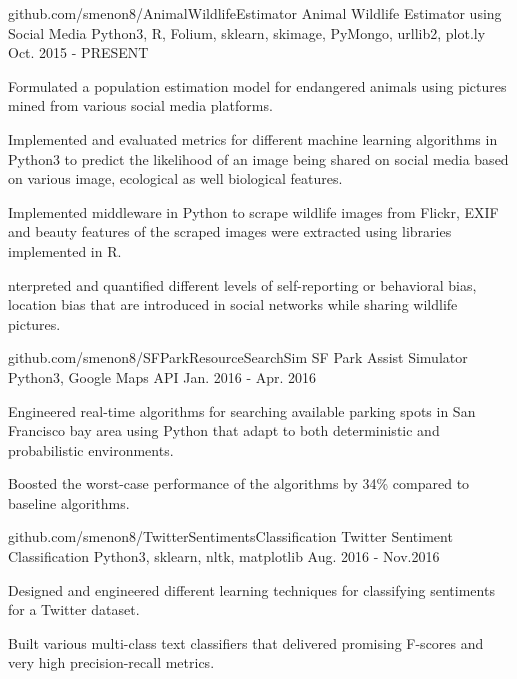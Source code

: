 \begin{cventries}

\cventry
    {github.com/smenon8/AnimalWildlifeEstimator} %
    {Animal Wildlife Estimator using Social Media} %
    {Python3, R, Folium, sklearn, skimage, PyMongo, urllib2, plot.ly} %
    {Oct. 2015 - PRESENT} %
    {
      \begin{cvitems} %
        \item {Formulated a population estimation model for endangered animals using pictures mined from various social media platforms.}
        \item {Implemented and evaluated metrics for different machine learning algorithms in Python3 to predict the likelihood of an image being shared on social media based on various image, ecological as well biological features.}
        \item{Implemented middleware in Python to scrape wildlife images from Flickr, EXIF and beauty features of the scraped images were extracted using libraries implemented in R.}
        \item{nterpreted and quantified different levels of self-reporting or behavioral bias, location bias that are introduced in social networks while sharing wildlife pictures.}
      \end{cvitems}
    } 
\cventry
    {github.com/smenon8/SFParkResourceSearchSim} %
    {SF Park Assist Simulator} %
    {Python3, Google Maps API} %
    {Jan. 2016 - Apr. 2016} %
    {
      \begin{cvitems} %
        \item {Engineered real-time algorithms for searching available parking spots in San Francisco bay area using Python that adapt to both deterministic and probabilistic environments.}
        \item {Boosted the worst-case performance of the algorithms by 34\% compared to baseline algorithms.}
      \end{cvitems}
    }
\cventry
    {github.com/smenon8/TwitterSentimentsClassification} %
    {Twitter Sentiment Classification} %
    {Python3, sklearn, nltk, matplotlib} %
    {Aug. 2016 - Nov.2016} %
    {
      \begin{cvitems} %
        \item {Designed and engineered different learning techniques for classifying sentiments for a Twitter dataset.}
        \item {Built various multi-class text classifiers that delivered promising F-scores and very high precision-recall metrics.}
      \end{cvitems}
    }


\end{cventries}
